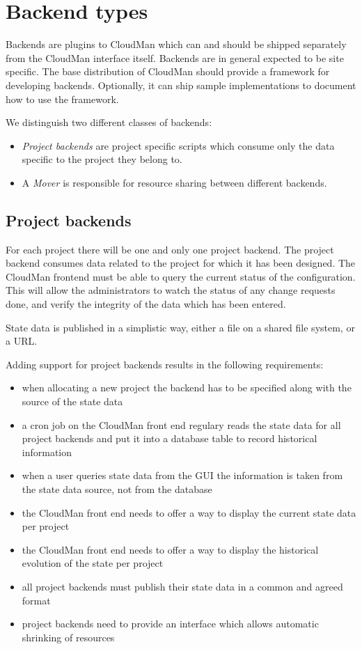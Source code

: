 \section{Backend types}
Backends are plugins to CloudMan which can and should be shipped separately from the CloudMan interface itself. Backends are in general expected to be site specific. The base distribution of CloudMan should provide a framework for developing backends. Optionally, it  can ship sample implementations to document how to use the framework.

We distinguish two different classes of backends:

\begin{itemize}
\item {\it Project backends} are project specific scripts which consume only the data specific to the project they belong to. 
\item A {\it Mover} is responsible for resource sharing between different backends. 
\end{itemize}

\subsection{Project backends}
For each project there will be one and only one project backend. The project backend consumes data related to the project for which it has been designed. The CloudMan frontend must be able to query the current status of the configuration. This will allow the administrators to watch the status of any change requests done, and verify the integrity of the data which has been entered. 

State data is published in a simplistic way, either a file on a shared file system, or a URL. 

Adding support for project backends results in the following requirements:
\begin{itemize}
 \item when allocating a new project the backend has to be specified along with the source of the state data 
 \item a cron job on the CloudMan front end regulary reads  the state data for all project backends and put it into a database table to record historical information
 \item when a user queries state data from the GUI the information is taken from the state data source, not from the database
 \item the CloudMan front end needs to offer a way to display the current state data per project
 \item the CloudMan front end needs to offer a way to display the historical evolution of the state per project 
 \item all project backends must publish their state data in a common and agreed format
 \item project backends need to provide an interface which allows automatic shrinking of resources
\end{itemize}

